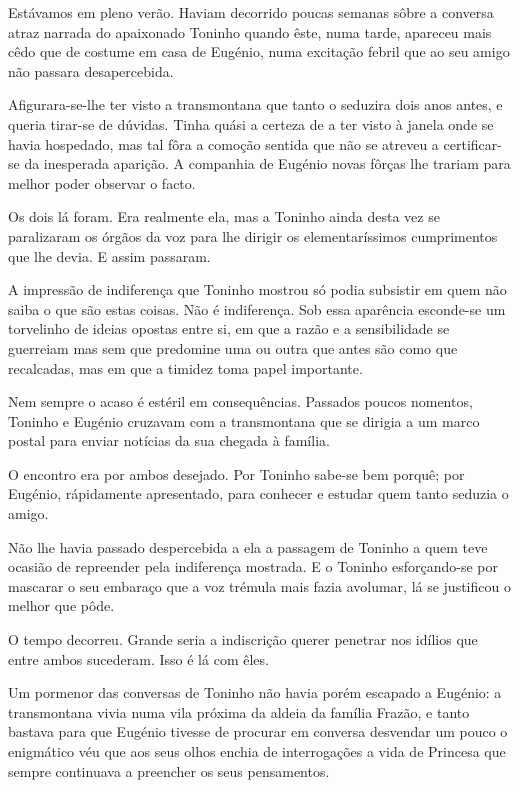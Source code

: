 \documentclass[9pt]{article}
\begin{document}
Estávamos em pleno verão. Haviam decorrido poucas semanas sô\-bre a conversa atraz
narrada do apaixonado Toninho quan\-do êste, numa tarde, apareceu mais cêdo
que de costume em casa de Eugé\-nio, numa  excita\-ção febril que ao seu amigo
não passara desapercebida.

Afigurara-se-\-lhe ter visto a transmontana que tanto o seduzira dois
anos antes, e queria tirar-se de dúvidas. Tinha quási a certeza de a ter
visto à janela onde se havia hospedado, mas tal fôra a como\-ção sentida que
não se atreveu a certifi\-car-se da inesperada apari\-ção. A companhia de Eugé\-nio novas fôrças lhe trariam para me\-lhor poder observar o facto.

Os dois lá foram. Era realmente ela, mas a Toninho ainda desta vez se
paralizaram os órgãos da voz para lhe dirigir os elementarís\-si\-mos cumprimentos que lhe devia. E assim passaram.

A impressão de indiferença que Toninho mostrou só podia subsistir
em quem não saiba o que são estas coisas. Não é indiferença. Sob essa aparência esconde-se um torvelinho de ideias opostas entre si, em que a razão
e a sensibilidade se guerreiam mas sem que predomine uma ou outra que antes
são como que recalcadas, mas em que a timidez toma papel importante.

Nem sempre o acaso é estéril em consequências. Passados poucos nomentos, Toninho e Eugé\-nio cruzavam com a transmontana que se dirigia a um marco postal para enviar notícias da sua chegada à fa\-mí\-lia.

O encontro era por ambos desejado. Por Toninho sabe-se bem por\-quê; por
Eugé\-nio, rápidamente apresentado, para conhecer e estudar quem tanto seduzia
o amigo.

Não lhe havia passado despercebida a ela a passagem de Toninho a quem teve
ocasião de repreender pela indiferença mostrada. E o Toninho esforçando-se por mascarar o seu embaraço que a voz trémula mais fazia avolumar, lá se justificou o me\-lhor que pôde.

O tempo decorreu. Grande seria a indiscri\-ção querer penetrar nos idílios que entre ambos sucederam. Isso é lá com êles.

Um pormenor das conversas de Toninho não havia porém escapado a Eugé\-nio: a
transmontana vivia numa vila próxima da aldeia da fa\-mí\-lia Frazão, e tanto
bastava para que Eugé\-nio tivesse de procurar em conversa desvendar um pouco o enigmático véu que aos seus o\-lhos enchia de interroga\-ções a vida de
Princesa que sempre continuava a preencher os seus pensamentos.
\end{document}
